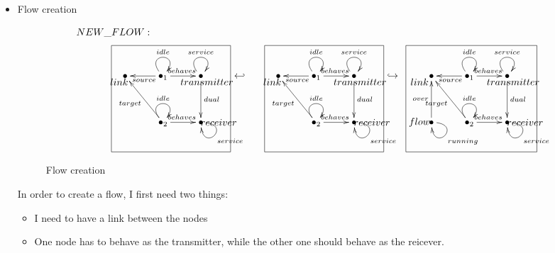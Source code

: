 \documentclass[envcountsect,runningheads]{llncs}
\begin{document}
  \begin{itemize}
    \item Flow creation
  \begin{figure}[H]
    \[
       \xymatrix@C=25pt@R=35pt
       {
         {}\POS[]-<1pc,0pc>\drop{NEW\_FLOW:}
         \\
         {\bullet} \POS[]-<.5pc,.5pc> \drop{link} &
         {\bullet}_{1} \ar@(ul,ur)^{idle} \ar@{->}^{behaves}[r] \ar@{->}^{source}[l] &
         {\bullet} \ar@(ul,ur)^{service} \ar@{->}^{dual}[d] \POS[]-<-0.5pc,.5pc> \drop{transmitter}
         & {\hookleftarrow} &
         {\bullet} \POS[]-<.5pc,.5pc> \drop{link} &
         {\bullet}_{1} \ar@(ul,ur)^{idle} \ar@{->}^{behaves}[r] \ar@{->}^{source}[l] &
         {\bullet} \ar@(ul,ur)^{service} \ar@{->}^{dual}[d] \POS[]-<-0.5pc,.5pc> \drop{transmitter}
         & {\hookrightarrow} &
         {\bullet} \POS[]-<1pc,.5pc> \drop{link} &
         {\bullet}_{1} \ar@(ul,ur)^{idle}\ar@{->}^{behaves}[r] \ar@{->}^{source}[l]
         &
         {\bullet} \ar@(ul,ur)^{service} \ar@{->}^{dual}[d] \POS[]-<-0.5pc,.5pc> \drop{transmitter}
         \\
         &
         {\bullet}_{2} \ar@(ul,ur)^{idle}\ar@{->}^{behaves}[r] \ar@{->}^{target}[ul] & 
         {\bullet} \ar@(r,d)^{service} \POS[]-<-1.5pc,0pc> \drop{receiver}
         \POS[]+<-2.5pc,2pc> *+=<10pc,9pc>[F-]{} & & &
         {\bullet}_{2} \ar@(ul,ur)^{idle}\ar@{->}^{behaves}[r] \ar@{->}^{target}[ul] & 
         {\bullet} \ar@(r,d)^{service} \POS[]-<-1.5pc,0pc> \drop{receiver}
         \POS[]+<-2.5pc,2pc> *+=<10pc,9pc>[F-]{} & &
         {\bullet} \ar@(r,d)^{running} \ar@{->}^{over}[u] \POS[]-<1pc,0pc> \drop{flow} &
         {\bullet}_{2} \ar@(ul,ur)^{idle}\ar@{->}^{behaves}[r] \ar@{->}^{target}[ul] & 
         {\bullet} \ar@(r,d)^{service} \POS[]-<-1.5pc,0pc> \drop{receiver}
         \POS[]+<-3pc,2pc> *+=<11pc,9pc>[F-]{}
       }
    \]
    \caption{Flow creation}
    \protect\label{fig:flowcreation}
  \end{figure}
  In order to create a flow, I first need two things: 
  \begin{itemize}
    \item I need to have a link between the nodes
    \item One node has to behave as the transmitter, while the other one should 
    behave as the reicever.  
   \end{itemize}
  

\end{itemize}
\end{document}
